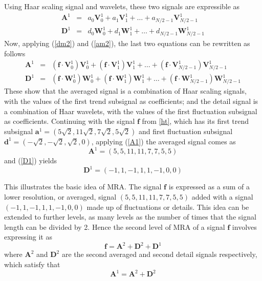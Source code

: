 \documentclass[a4paper,11pt]{article}
\begin{document}
Using Haar scaling signal and wavelets, these two signals are expressible as
\begin{eqnarray}
\mathbf{A}^{1} &=& a_{0}\mathbf{V}_{0}^{1}+a_{1}\mathbf{V}_{1}^{1}+\ldots+a_{N/2-1}\mathbf{V}_{N/2-1}^{1} \label{A1} \\
\mathbf{D}^{1} &=& d_{0}\mathbf{W}_{0}^{1}+d_{1}\mathbf{W}_{1}^{1}+\ldots+d_{N/2-1}\mathbf{W}_{N/2-1}^{1} \label{D1}
\end{eqnarray}
Now, applying (\ref{dm2}) and (\ref{am2}), the last two equations can be rewritten as follows
\begin{eqnarray*}
\mathbf{A}^{1} &=& (\mathbf{f}\cdot\mathbf{V}_{0}^{1})\mathbf{V}_{0}^{1}+(\mathbf{f}\cdot\mathbf{V}_{1}^{1})\mathbf{V}_{1}^{1}+\ldots+(\mathbf{f}\cdot\mathbf{V}_{N/2-1}^{1})\mathbf{V}_{N/2-1}^{1} \\
\mathbf{D}^{1} &=& (\mathbf{f}\cdot\mathbf{W}_{0}^{1})\mathbf{W}_{0}^{1}+(\mathbf{f}\cdot\mathbf{W}_{1}^{1})\mathbf{W}_{1}^{1}+\ldots+(\mathbf{f}\cdot\mathbf{W}_{N/2-1}^{1})\mathbf{W}_{N/2-1}^{1} 
\end{eqnarray*}
These show that the averaged signal is a combination of Haar scaling signals, with the values of the first trend subsignal as coefficients; and the detail signal is a combination of Haar wavelets, with the values of the first fluctuation subsignal as coefficients. Continuing with the signal $\mathbf{f}$ from \ref{ht}, which has its first trend subsignal $\mathbf{a}^{1}=(5\sqrt{2},11\sqrt{2},7\sqrt{2},5\sqrt{2})$ and first fluctuation subsignal $\mathbf{d}^{1}=(-\sqrt{2},-\sqrt{2},\sqrt{2},0)$, applying (\ref{A1}) the averaged signal comes as
\begin{equation}
\mathbf{A}^{1} = (5,5,11,11,7,7,5,5)
\end{equation}
and (\ref{D1}) yields
\begin{equation}
\mathbf{D}^{1} = (-1,1,-1,1,1,-1,0,0)
\end{equation}

This illustrates the basic idea of MRA. The signal $\mathbf{f}$ is expressed as a sum of a lower resolution, or averaged, signal $(5,5,11,11,7,7,5,5)$ added with a signal $(-1,1,-1,1,1,-1,0,0)$ made up of fluctuations or details. This idea can be extended to further levels, as many levels as the number of times that the signal length can be divided by 2. Hence the second level of MRA of a signal $\mathbf{f}$ involves expressing it as
\begin{equation}
\mathbf{f} = \mathbf{A}^{2} + \mathbf{D}^{2} + \mathbf{D}^{1}
\end{equation}
where $\mathbf{A}^{2}$ and $\mathbf{D}^{2}$ are the second averaged and second detail signals respectively, which satisfy that
\begin{equation}
\mathbf{A}^{1} = \mathbf{A}^{2} + \mathbf{D}^{2}
\end{equation}
\end{document}

